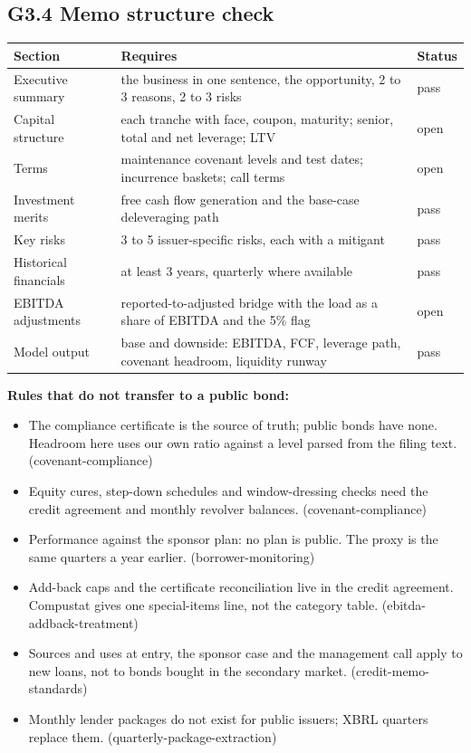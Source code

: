 \documentclass[11pt,a4paper]{article}
\begin{document}
\subsection*{G3.4 Memo structure check}
\begin{center}\footnotesize\setlength{\tabcolsep}{3.5pt}\begin{tabular}{@{}lp{9cm}l@{}}\toprule
Section & Requires & Status \\\midrule
Executive summary & the business in one sentence, the opportunity, 2 to 3 reasons, 2 to 3 risks & \textcolor{good}{pass} \\
Capital structure & each tranche with face, coupon, maturity; senior, total and net leverage; LTV & \textcolor{amber}{open} \\
Terms & maintenance covenant levels and test dates; incurrence baskets; call terms & \textcolor{amber}{open} \\
Investment merits & free cash flow generation and the base-case deleveraging path & \textcolor{good}{pass} \\
Key risks & 3 to 5 issuer-specific risks, each with a mitigant & \textcolor{good}{pass} \\
Historical financials & at least 3 years, quarterly where available & \textcolor{good}{pass} \\
EBITDA adjustments & reported-to-adjusted bridge with the load as a share of EBITDA and the 5\% flag & \textcolor{amber}{open} \\
Model output & base and downside: EBITDA, FCF, leverage path, covenant headroom, liquidity runway & \textcolor{good}{pass} \\
\bottomrule\end{tabular}\end{center}
\textbf{Rules that do not transfer to a public bond:}\begin{itemize}\item The compliance certificate is the source of truth; public bonds have none. Headroom here uses our own ratio against a level parsed from the filing text. (covenant-compliance)\item Equity cures, step-down schedules and window-dressing checks need the credit agreement and monthly revolver balances. (covenant-compliance)\item Performance against the sponsor plan: no plan is public. The proxy is the same quarters a year earlier. (borrower-monitoring)\item Add-back caps and the certificate reconciliation live in the credit agreement. Compustat gives one special-items line, not the category table. (ebitda-addback-treatment)\item Sources and uses at entry, the sponsor case and the management call apply to new loans, not to bonds bought in the secondary market. (credit-memo-standards)\item Monthly lender packages do not exist for public issuers; XBRL quarters replace them. (quarterly-package-extraction)\end{itemize}
\end{document}

